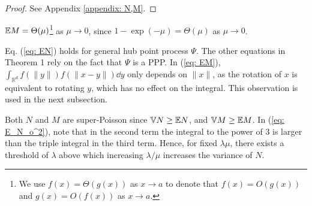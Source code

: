 \begin{proof}
See Appendix \ref{appendix: N,M}.
   \end{proof}
   \begin{remark} 
       $\mathbb{E} M = {\Theta}(\mu)$\footnote{We use $f(x)=\Theta(g(x))$ as $x\to a$ to denote that $f(x)=O\left(g(x)\right)$ and $ g(x)=O(f(x))$ as $x\to a$.} as $\mu\to0$, since $1-\exp(-\mu) = {\Theta}(\mu)$ as $\mu\to0$.
   \end{remark}
 \begin{remark}
Eq. (\ref{eq: EN}) holds for general hub point process $\Psi$. The other equations in Theorem 1 rely on the fact that $\Psi$ is a PPP.  In (\ref{eq: EM}), $\int_{\mathbb{R}^d}f(\|y\|)f(\|x-y\|)\dd y$ only depends on $\|x\|$, as the rotation of $x$ is equivalent to rotating $y$, which has no effect on the integral. This observation is used in the next subsection.
 \end{remark} 
 \begin{remark}
  Both $N$ and $M$ are super-Poisson since $\mathbb{V} N\geq \mathbb{E} N$, and $\mathbb{V} M\geq \mathbb{E} M$. In (\ref{eq: E_N_o^2}), note that in the second term the integral to the power of 3 is larger than the triple integral in the third term. Hence, for fixed $\lambda\mu$, there exists a threshold of $\lambda$ above which increasing $\lambda/\mu$ increases the variance of $N$.
 \end{remark}


 





 
   
